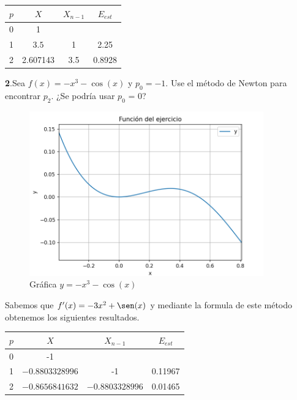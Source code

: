 \documentclass[12pt]{article}
\begin{document}
\begin{center}
    \begin{tabular}{|c|c|c|c|}
        \hline
        $p$&$X$&$X_{n-1}$&$E_{est}$\\
        \hline
        0 & 1&  & \\
        1 &$ 3.5$& 1&2.25\\
        2 & 2.607143& 3.5&0.8928\\
        \hline
      \end{tabular} 
\end{center}


\textbf{2}.Sea $f(x) = -x^3 - \cos(x)$ y $p_0 = -1$. Use el método de Newton para encontrar $p_2$. ¿Se podría usar $p_0$ = 0?

\begin{figure}[H]
    \centering
    \begin{minipage}{0.5\textwidth}
        \centering
        \includegraphics[width=0.9\textwidth]{./inFiles/Figures/Cap1.png}
        \caption{Gráfica \( y = -x^3 - \cos(x) \)}
    \end{minipage}
\end{figure}

Sabemos que $f'(x) = -3x^2 + \sen(x)$ y mediante la formula de este método obtenemos los siguientes resultados.


\begin{center}
    \begin{tabular}{|c|c|c|c|}
        \hline
        $p$&$X$&$X_{n-1}$&$E_{est}$\\
        \hline
        0 & -1&  & \\
        1 &$-0.8803328996$& -1&0.11967\\
        2 &$-0.8656841632$&$-0.8803328996$&0.01465\\
        \hline
      \end{tabular} 
\end{center}
\end{document}
